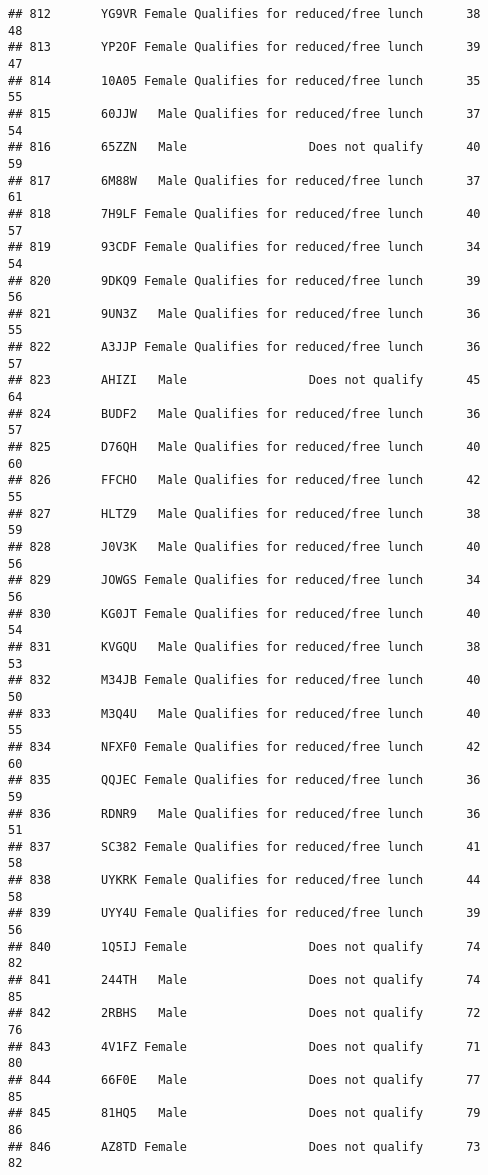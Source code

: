 \documentclass[
]{article}
\begin{document}
\begin{verbatim}
## 812       YG9VR Female Qualifies for reduced/free lunch      38       48
## 813       YP2OF Female Qualifies for reduced/free lunch      39       47
## 814       10A05 Female Qualifies for reduced/free lunch      35       55
## 815       60JJW   Male Qualifies for reduced/free lunch      37       54
## 816       65ZZN   Male                 Does not qualify      40       59
## 817       6M88W   Male Qualifies for reduced/free lunch      37       61
## 818       7H9LF Female Qualifies for reduced/free lunch      40       57
## 819       93CDF Female Qualifies for reduced/free lunch      34       54
## 820       9DKQ9 Female Qualifies for reduced/free lunch      39       56
## 821       9UN3Z   Male Qualifies for reduced/free lunch      36       55
## 822       A3JJP Female Qualifies for reduced/free lunch      36       57
## 823       AHIZI   Male                 Does not qualify      45       64
## 824       BUDF2   Male Qualifies for reduced/free lunch      36       57
## 825       D76QH   Male Qualifies for reduced/free lunch      40       60
## 826       FFCHO   Male Qualifies for reduced/free lunch      42       55
## 827       HLTZ9   Male Qualifies for reduced/free lunch      38       59
## 828       J0V3K   Male Qualifies for reduced/free lunch      40       56
## 829       JOWGS Female Qualifies for reduced/free lunch      34       56
## 830       KG0JT Female Qualifies for reduced/free lunch      40       54
## 831       KVGQU   Male Qualifies for reduced/free lunch      38       53
## 832       M34JB Female Qualifies for reduced/free lunch      40       50
## 833       M3Q4U   Male Qualifies for reduced/free lunch      40       55
## 834       NFXF0 Female Qualifies for reduced/free lunch      42       60
## 835       QQJEC Female Qualifies for reduced/free lunch      36       59
## 836       RDNR9   Male Qualifies for reduced/free lunch      36       51
## 837       SC382 Female Qualifies for reduced/free lunch      41       58
## 838       UYKRK Female Qualifies for reduced/free lunch      44       58
## 839       UYY4U Female Qualifies for reduced/free lunch      39       56
## 840       1Q5IJ Female                 Does not qualify      74       82
## 841       244TH   Male                 Does not qualify      74       85
## 842       2RBHS   Male                 Does not qualify      72       76
## 843       4V1FZ Female                 Does not qualify      71       80
## 844       66F0E   Male                 Does not qualify      77       85
## 845       81HQ5   Male                 Does not qualify      79       86
## 846       AZ8TD Female                 Does not qualify      73       82

\end{verbatim}
\end{document}
